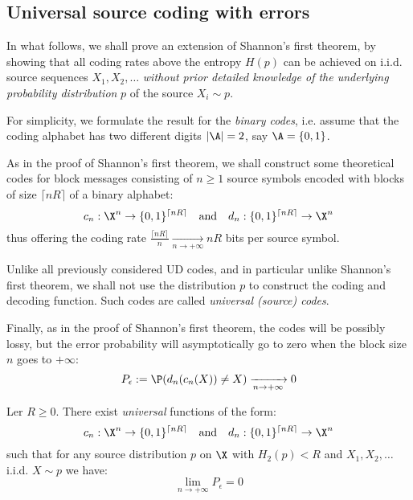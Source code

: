 \documentclass[toc]{../cs-classes/cs-classes}
\begin{document}
\subsection{Universal source coding with errors}
In what follows, we shall prove an extension of Shannon's first theorem, by showing that all coding rates above the entropy $H(p)$ can be achieved on i.i.d. source sequences $X_1, X_2, \dots$ \emph{without prior detailed knowledge of the underlying probability distribution} $p$ of the source $X_i\sim p$.

For simplicity, we formulate the result for the \emph{binary codes}, i.e. assume that the coding alphabet has two different digits $|\A|=2$, say $\A=\{0, 1\}$.

As in the proof of Shannon's first theorem, we shall construct some theoretical codes for block messages consisting of $n\geq 1$ source symbols encoded with blocks of size $\lceil nR\rceil$ of a binary alphabet:
\begin{equation*}
    c_n:\X^n \rightarrow \{0, 1\}^{\lceil nR\rceil} \quad\textnormal{and}\quad d_n:\{0, 1\}^{\lceil nR\rceil} \rightarrow \X^n
\end{equation*}
thus offering the coding rate $\frac{\lceil nR\rceil}{n} \xrightarrow[n\to+\infty]{} nR$ bits per source symbol.

Unlike all previously considered UD codes, and in particular unlike Shannon's first theorem, we shall not use the distribution $p$ to construct the coding and decoding function. Such codes are called \emph{universal (source) codes}.

Finally, as in the proof of Shannon's first theorem, the codes will be possibly lossy, but the error probability will asymptotically go to zero when the block size $n$ goes to $+\infty$:
\begin{equation*}
    P_\epsilon := \P(d_n(c_n(X))\neq X) \xrightarrow[n\to+\infty]{} 0
\end{equation*}

\begin{theorem}
    Ler $R\geq 0$. There exist \emph{universal} functions of the form:
    \begin{equation*}
        c_n:\X^n \rightarrow \{0, 1\}^{\lceil nR\rceil} \quad\textnormal{and}\quad d_n:\{0, 1\}^{\lceil nR\rceil} \rightarrow \X^n
    \end{equation*}
    such that for any source distribution $p$ on $\X$ with $H_2(p)<R$ and $X_1, X_2, \dots$ i.i.d. $X\sim p$ we have:
    \begin{equation*}
        \lim_{n\to+\infty}P_\epsilon = 0
    \end{equation*}
\end{theorem}
\end{document}
